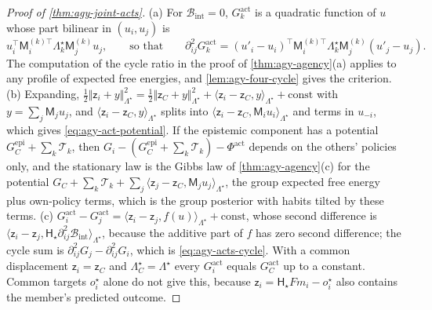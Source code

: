 \begin{proof}[Proof of \cref{thm:agy-joint-acts}]
(a) For $\mathcal B_{\mathrm{int}}=0$, $G^{\mathrm{act}}_k$ is a quadratic function of $u$ whose part bilinear in $(u_i,u_j)$ is
\begin{equation*}
u_i^\top\mathsf M^{(k)\top}_i\Lambda^\star_k\mathsf M^{(k)}_ju_j,\qquad\text{so that}\qquad\partial^2_{ij}G^{\mathrm{act}}_k=(u'_i-u_i)^\top\mathsf M^{(k)\top}_i\Lambda^\star_k\mathsf M^{(k)}_j(u'_j-u_j).
\end{equation*}
The computation of the cycle ratio in the proof of \cref{thm:agy-agency}(a) applies to any profile of expected free energies, and \cref{lem:agy-four-cycle} gives the criterion. (b) Expanding, $\frac12\Vert\mathsf z_i+y\Vert^2_{\Lambda^\star}=\frac12\Vert\mathsf z_C+y\Vert^2_{\Lambda^\star}+\langle\mathsf z_i-\mathsf z_C,y\rangle_{\Lambda^\star}+\mathrm{const}$ with $y=\sum_j\mathsf M_ju_j$, and $\langle\mathsf z_i-\mathsf z_C,y\rangle_{\Lambda^\star}$ splits into $\langle\mathsf z_i-\mathsf z_C,\mathsf M_iu_i\rangle_{\Lambda^\star}$ and terms in $u_{-i}$, which gives \eqref{eq:agy-act-potential}. If the epistemic component has a potential $G^{\mathrm{epi}}_C+\sum_k\mathcal T_k$, then $G_i-(G^{\mathrm{epi}}_C+\sum_k\mathcal T_k)-\Phi^{\mathrm{act}}$ depends on the others' policies only, and the stationary law is the Gibbs law of \cref{thm:agy-agency}(c) for the potential $G_C+\sum_k\mathcal T_k+\sum_j\langle\mathsf z_j-\mathsf z_C,\mathsf M_ju_j\rangle_{\Lambda^\star}$, the group expected free energy plus own-policy terms, which is the group posterior with habits tilted by these terms. (c) $G^{\mathrm{act}}_i-G^{\mathrm{act}}_j=\langle\mathsf z_i-\mathsf z_j,f(u)\rangle_{\Lambda^\star}+\mathrm{const}$, whose second difference is $\langle\mathsf z_i-\mathsf z_j,\mathsf H_\star\partial^2_{ij}\mathcal B_{\mathrm{int}}\rangle_{\Lambda^\star}$, because the additive part of $f$ has zero second difference; the cycle sum is $\partial^2_{ij}G_j-\partial^2_{ij}G_i$, which is \eqref{eq:agy-acts-cycle}. With a common displacement $\mathsf z_i=\mathsf z_C$ and $\Lambda^\star_C=\Lambda^\star$ every $G^{\mathrm{act}}_i$ equals $G^{\mathrm{act}}_C$ up to a constant. Common targets $o^\star_i$ alone do not give this, because $\mathsf z_i=\mathsf H_\star Fm_i-o^\star_i$ also contains the member's predicted outcome.
\end{proof}


